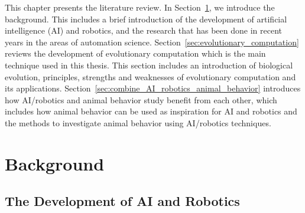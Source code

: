 This chapter presents the literature review. In Section~\ref{sec:background}, we introduce the background. This includes a brief introduction of the development of artificial intelligence (AI) and robotics, and the research that has been done in recent years in the areas of automation science. Section~\ref{sec:evolutionary_computation} reviews the development of evolutionary computation which is the main technique used in this thesis. This section includes an introduction of biological evolution, principles, strengths and weaknesses of evolutionary computation and its applications. Section~\ref{sec:combine_AI_robotics_animal_behavior} introduces how AI/robotics and animal behavior study benefit from each other, which includes how animal behavior can be used as inspiration for AI and robotics and the methods to investigate animal behavior using AI/robotics techniques.  

\section{Background}\label{sec:background}

\subsection{The Development of AI and Robotics}\label{sec:development_of_AI_Robotics}

